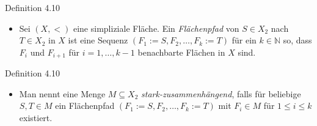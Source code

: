 \documentclass{beamer}
\begin{document}
\begin{frame}
\begin{block}{Definition 4.10}
\begin{itemize}
\item Sei $(X,<)$ eine simpliziale Fläche. Ein \emph{Flächenpfad} von $S\in X_{2}$ nach $T \in X_{2}$ in $X$ ist eine Sequenz $(F_1:=S,F_{2},\ldots,F_{k}:=T)$ für ein $k \in \mathbb{N}$ so, dass $F_{i} $ und $F_{i+1}$ für $i=1,\ldots,k-1$ benachbarte Flächen in $X$ sind.
\end{itemize}
\end{block}
\end{frame}
\begin{frame}
\begin{block}{Definition 4.10}
\begin{itemize}
\item Man nennt eine Menge $M\subseteq X_2$  \emph{stark-zusammenhängend}, falls für beliebige $S,T \in M$ ein Flächenpfad $(F_{1}:=S,F_{2},\ldots,F_{k}:=T)$ mit $F_i \in M$ für $1\leq i \leq k$ existiert. 
\end{itemize}
\end{block}
\end{frame}
\end{document}
